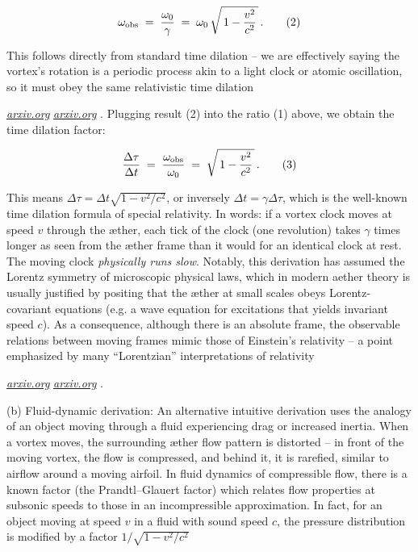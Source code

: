 \documentclass[aps,preprint,superscriptaddress]{revtex4}
\begin{document}
 \begin{equation}
\omega_{\rm obs} \;=\; \frac{\omega_0}{\gamma} \;=\; \omega_0\,\sqrt{\,1-\frac{v^2}{c^2}\,}\,. \tag{2}
 \end{equation}

This follows directly from standard time dilation – we are effectively saying the vortex’s rotation is a periodic process akin to a light clock or atomic oscillation, so it must obey the same relativistic time dilation

\href{https://arxiv.org/pdf/physics/0611077#:~:text=This%20formula%20has%20the%20same,2%29%20of}{\textit{arxiv.org}}
\href{https://arxiv.org/pdf/physics/0611077#:~:text=relativity%20theory%2C%20but%20obviously%20its,light%20in%20all%20inertial%20frames}{\textit{arxiv.org}}
. Plugging result (2) into the ratio (1) above, we obtain the time dilation factor:

 \begin{equation}
\frac{\Delta \tau}{\Delta t} \;=\; \frac{\omega_{\rm obs}}{\omega_0} \;=\; \sqrt{\,1-\frac{v^2}{c^2}\,}\,. \tag{3}
 \end{equation}

This means $\Delta \tau = \Delta t \sqrt{1-v^2/c^2}$, or inversely $\Delta t = \gamma \Delta \tau$, which is the well-known time dilation formula of special relativity. In words: if a vortex clock moves at speed $v$ through the æther, each tick of the clock (one revolution) takes $\gamma$ times longer as seen from the æther frame than it would for an identical clock at rest. The moving clock \textit{physically runs slow}. Notably, this derivation has assumed the Lorentz symmetry of microscopic physical laws, which in modern aether theory is usually justified by positing that the æther at small scales obeys Lorentz-covariant equations (e.g. a wave equation for excitations that yields invariant speed $c$). As a consequence, although there is an absolute frame, the observable relations between moving frames mimic those of Einstein’s relativity – a point emphasized by many “Lorentzian” interpretations of relativity

\href{https://arxiv.org/pdf/physics/0611077#:~:text=relativity%20theory%2C%20but%20obviously%20its,light%20in%20all%20inertial%20frames}{\textit{arxiv.org}}
\href{https://arxiv.org/pdf/physics/0611077#:~:text=We%20should%20note%20that%2C%20when,a%20state%20of%20absolute%20rest}{\textit{arxiv.org}}
.

(b) Fluid-dynamic derivation: An alternative intuitive derivation uses the analogy of an object moving through a fluid experiencing drag or increased inertia. When a vortex moves, the surrounding æther flow pattern is distorted – in front of the moving vortex, the flow is compressed, and behind it, it is rarefied, similar to airflow around a moving airfoil. In fluid dynamics of compressible flow, there is a known factor (the Prandtl–Glauert factor) which relates flow properties at subsonic speeds to those in an incompressible approximation. In fact, for an object moving at speed $v$ in a fluid with sound speed $c$, the pressure distribution is modified by a factor $1/\sqrt{1-v^2/c^2}$
\end{document}
